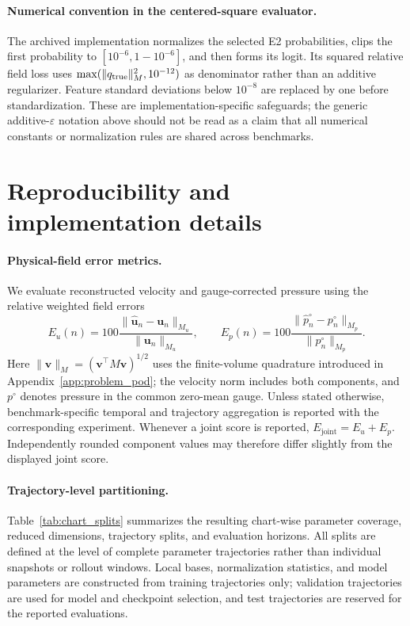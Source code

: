 \documentclass{article}
\begin{document}
\paragraph{Numerical convention in the centered-square evaluator.}
The archived implementation normalizes the selected E2 probabilities, clips the first probability to $[10^{-6},1-10^{-6}]$, and then forms its logit. Its squared relative field loss uses $\max(\|q_{\rm true}\|_M^2,10^{-12})$ as denominator rather than an additive regularizer. Feature standard deviations below $10^{-8}$ are replaced by one before standardization. These are implementation-specific safeguards; the generic additive-$\varepsilon$ notation above should not be read as a claim that all numerical constants or normalization rules are shared across benchmarks.

\section{Reproducibility and implementation details}
\label{app:implementation}

\paragraph{Physical-field error metrics.}
We evaluate reconstructed velocity and gauge-corrected pressure using the relative weighted field errors
\begin{equation}
E_u(n)
=
100\frac{
\|\widehat{\bm u}_n-\bm u_n\|_{M_u}
}{
\|\bm u_n\|_{M_u}
},
\qquad
E_p(n)
=
100\frac{
\|\widehat p_n^\circ-p_n^\circ\|_{M_p}
}{
\|p_n^\circ\|_{M_p}
}.
\label{eq:field_errors}
\end{equation}
Here $\|\bm v\|_M=(\bm v^\top M\bm v)^{1/2}$ uses the finite-volume
quadrature introduced in Appendix~\ref{app:problem_pod}; the velocity norm includes both components, and $p^\circ$ denotes pressure in the common zero-mean gauge. Unless stated otherwise, benchmark-specific temporal and trajectory aggregation is reported with the corresponding experiment. Whenever a joint score is reported,
$E_{\mathrm{joint}}=E_u+E_p$. Independently rounded component values may therefore differ slightly from the displayed joint score.


\paragraph{Trajectory-level partitioning.}
Table~\ref{tab:chart_splits} summarizes the resulting chart-wise parameter coverage, reduced dimensions, trajectory splits, and evaluation horizons. All splits are defined at the level of complete parameter trajectories rather than individual snapshots or rollout windows. Local bases, normalization statistics, and model parameters are constructed from training trajectories only; validation trajectories are used for model and checkpoint selection, and test trajectories are reserved for the reported evaluations. 
\end{document}
